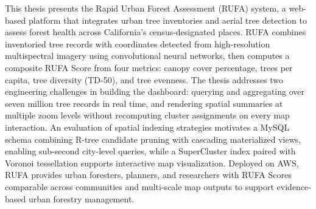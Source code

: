 This thesis presents the Rapid Urban Forest Assessment (RUFA) system, a web-based platform that integrates urban tree inventories and aerial tree detection to assess forest health across California's census-designated places. RUFA combines inventoried tree records with coordinates detected from high-resolution multispectral imagery using convolutional neural networks, then computes a composite RUFA Score from four metrics: canopy cover percentage, trees per capita, tree diversity (TD-50), and tree evenness. The thesis addresses two engineering challenges in building the dashboard: querying and aggregating over seven million tree records in real time, and rendering spatial summaries at multiple zoom levels without recomputing cluster assignments on every map interaction. An evaluation of spatial indexing strategies motivates a MySQL schema combining R-tree candidate pruning with cascading materialized views, enabling sub-second city-level queries, while a SuperCluster index paired with Voronoi tessellation supports interactive map visualization. Deployed on AWS, RUFA provides urban foresters, planners, and researchers with RUFA Scores comparable across communities and multi-scale map outputs to support evidence-based urban forestry management.
